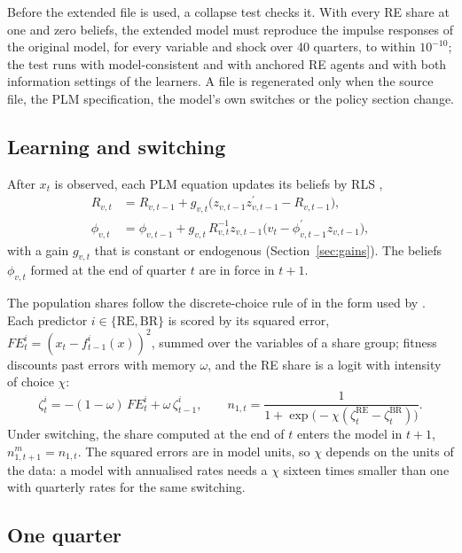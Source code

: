 \documentclass[pdflatex,sn-basic]{sn-jnl}
\newcommand{\RE}{\mathrm{RE}}
\newcommand{\BR}{\mathrm{BR}}
\newcommand{\FE}{\mathit{FE}}
\newcommand{\transp}{^{\prime}}
\begin{document}
Before the extended file is used, a collapse test checks it. With every RE share at one and zero
beliefs, the extended model must reproduce the impulse responses of the original model, for
every variable and shock over 40 quarters, to within $10^{-10}$; the test runs with
model-consistent and with anchored RE agents and with both information settings of the
learners. A file is regenerated only when the source file, the PLM specification, the model's
own switches or the policy section change.

\subsection{Learning and switching}\label{sec:learning}

After $x_t$ is observed, each PLM equation updates its beliefs by RLS \citep{evans2001},
\begin{align}
  R_{v,t} &= R_{v,t-1} + g_{v,t}\bigl(z_{v,t-1} z_{v,t-1}\transp - R_{v,t-1}\bigr), \label{eq:rlsR}\\
  \phi_{v,t} &= \phi_{v,t-1} + g_{v,t}\, R_{v,t}^{-1} z_{v,t-1}\bigl(v_t - \phi_{v,t-1}\transp z_{v,t-1}\bigr), \label{eq:rlsphi}
\end{align}
with a gain $g_{v,t}$ that is constant or endogenous (Section~\ref{sec:gains}). The beliefs
$\phi_{v,t}$ formed at the end of quarter $t$ are in force in $t+1$.

The population shares follow the discrete-choice rule of \citet{brock1997} in the form used by
\citet{ozden2025}. Each predictor $i\in\{\RE,\BR\}$ is scored by its squared error,
$\FE^{i}_t = (x_t - f^{i}_{t-1}(x))^2$, summed over the variables of a share group; fitness
discounts past errors with memory $\omega$, and the RE share is a logit with intensity of choice
$\chi$:
\begin{equation}\label{eq:switch}
  \zeta^{i}_{t} = -(1-\omega)\,\FE^{i}_{t} + \omega\,\zeta^{i}_{t-1}, \qquad
  n_{1,t} = \frac{1}{1 + \exp\bigl(-\chi(\zeta^{\RE}_{t} - \zeta^{\BR}_{t})\bigr)} .
\end{equation}
Under switching, the share computed at the end of $t$ enters the model in $t+1$,
$n^{m}_{1,t+1} = n_{1,t}$. The squared errors are in model units, so $\chi$ depends on the units
of the data: a model with annualised rates needs a $\chi$ sixteen times smaller than one with
quarterly rates for the same switching.

\subsection{One quarter}\label{sec:quarter}
\end{document}
